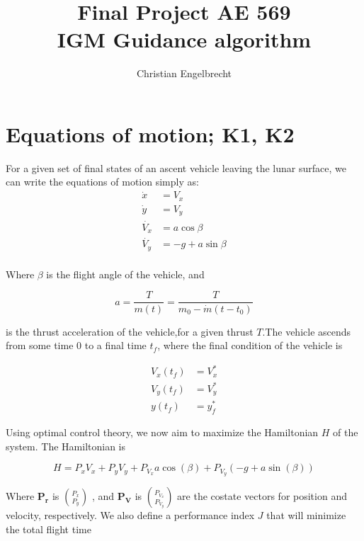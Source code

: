 \documentclass{article}
\begin{document}
\title{Final Project AE 569\\\large IGM Guidance algorithm}

\author{Christian Engelbrecht}


\maketitle

\newpage
\section{Equations of motion; K1, K2}

For a given set of final states of an ascent vehicle leaving the lunar surface, we can write the equations of motion simply as:\newline
\begin{align*}
\dot{x} &= V_x \\ 
\dot{y} &= V_y \\ 
\dot{V_x} &= a\cos{\beta} \\ 
\dot{V_y} &= -g + a\sin{\beta} \\ 
\end{align*}

Where $\beta$ is the flight angle of the vehicle, and

\begin{equation*} %
a = \frac{T}{m(t)} = \frac{T}{m_0 - \dot{m}(t - t_0)}
\end{equation*}

is the thrust acceleration of the vehicle,for a given thrust $T$.The vehicle ascends from some time 0 to a final time $t_f$, where the final condition of the vehicle is 

\begin{align*}
V_x(t_f) &= V_x^* \\
V_y(t_f) &= V_y^* \\
y(t_f) &= y_f^*
\end{align*}

Using optimal control theory, we now aim to maximize the Hamiltonian $H$ of the system. The Hamiltonian is 

\begin{equation*}
H = P_x V_x + P_yV_y + P_{V_{x}} a\cos(\beta) + P_{V_{y}}(-g +a\sin(\beta))
\end{equation*}

Where $\boldsymbol{P_r}$ is $\binom{P_x}{P_y}$ , and $\boldsymbol{P_V}$ is $\binom{P_{V_{x}}}{P_{V_{y}}}$ are the costate vectors for 
position and velocity, respectively. \newline
We also define a performance index $J$ that will minimize the total flight time 
\end{document}
